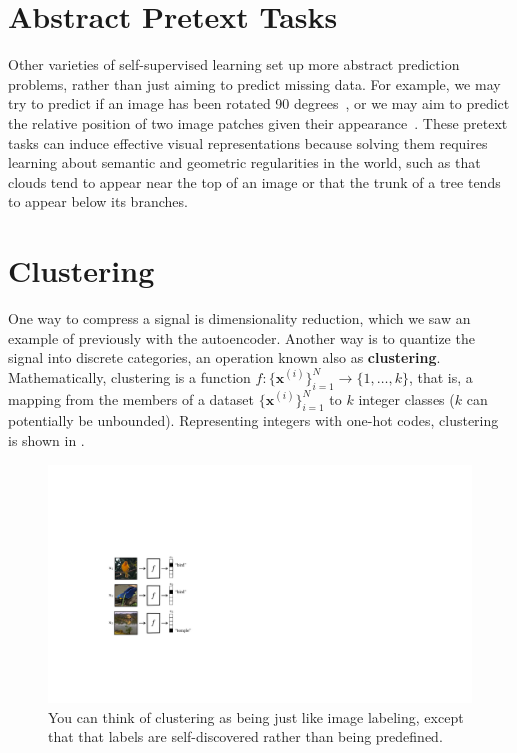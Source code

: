 \section{Abstract Pretext Tasks}
Other varieties of self-supervised learning set up more abstract prediction problems, rather than just aiming to predict missing data. For example, we may try to predict if an image has been rotated 90 degrees~\cite{komodakis2018unsupervised}, or we may aim to predict the relative position of two image patches given their appearance~\cite{doersch2015unsupervised}. These pretext tasks can induce effective visual representations because solving them requires learning about semantic and geometric regularities in the world, such as that clouds tend to appear near the top of an image or that the trunk of a tree tends to appear below its branches.

\section{Clustering}
One way to compress a signal is dimensionality reduction, which we saw an example of previously with the autoencoder. Another way is to quantize the signal into discrete categories, an operation known also as {\bf clustering}. Mathematically, clustering is a function $f: \{\mathbf{x}^{(i)}\}_{i=1}^N \rightarrow \{1,\dots,k\}$, that is, a mapping from the members of a dataset $\{\mathbf{x}^{(i)}\}_{i=1}^N$ to $k$ integer classes ($k$ can potentially be unbounded). Representing integers with one-hot codes, clustering is shown in \fig{\ref{fig:representation_learning:clustering_f_diagram}}.
\begin{figure}[h!]
    \centerline{
        \includegraphics[width=0.4\linewidth]{figures/representation_learning/clustering_f_diagram.pdf}
    }
    \caption{You can think of clustering as being just like image labeling, except that that labels are self-discovered rather than being predefined.}
    \label{fig:representation_learning:clustering_f_diagram}
    \vspace{-1.0em}
\end{figure}


